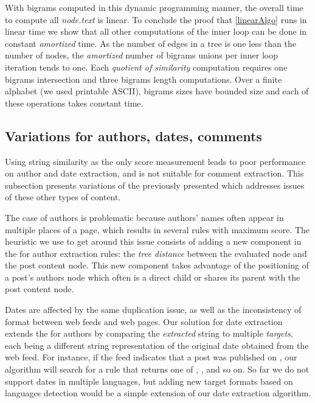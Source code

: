 \linearAlgo

With bigrams computed in this dynamic programming manner, the overall time to compute all \code{(}\emph{node.text}\code{)} is linear. To conclude the proof that \autoref{linearAlgo} runs in linear time we show that all other computations of the inner loop can be done in constant \emph{amortized} time. As the number of edges in a tree is one less than the number of nodes, the \emph{amortized} number of bigrams unions per inner loop iteration tends to one. Each \emph{quotient of similarity} computation requires one bigrams intersection and three bigrams length computations. Over a finite alphabet (we used printable ASCII), bigrams sizes have bounded size and each of these operations takes constant time.


\subsection{Variations for authors, dates, comments}
\label{variationsforauthorsdatesandcomments}

Using string similarity as the only score measurement leads to poor performance on author and date extraction, and is not suitable for comment extraction. This subsection presents variations of the previously presented  which addresses issues of these other types of content.

The case of authors is problematic because authors' names often appear in multiple places of a page, which results in several rules with maximum  score. The heuristic we use to get around this issue consists of adding a new component in the  for author extraction rules: the \emph{tree distance} between the evaluated node and the post content node. This new component takes advantage of the positioning of a post's authors node which often is a direct child or shares its parent with the post content node.

Dates are affected by the same duplication issue, as well as the inconsistency of format between web feeds and web pages. Our solution for date extraction extends the  for authors by comparing the \emph{extracted} string to multiple \emph{targets}, each being a different string representation of the original date obtained from the web feed. For instance, if the feed indicates that a post was published on , our algorithm will search for a rule that returns one of , ,  and so on. So far we do not support dates in multiple languages, but adding new target formats based on languages detection would be a simple extension of our date extraction algorithm.

